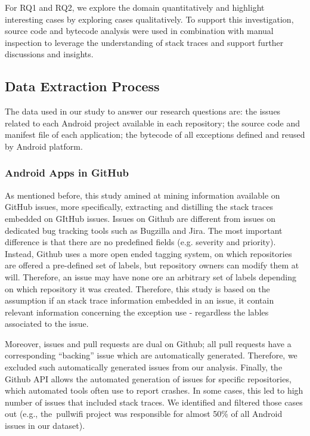 \documentclass[conference]{IEEEtran}
\begin{document}
For RQ1 and RQ2, we explore the domain quantitatively and highlight interesting cases by 
exploring cases qualitatively. To support this investigation, source code and bytecode 
analysis were used in combination with manual inspection to leverage the  understanding of stack traces and support further discussions and insights. 

\subsection{Data Extraction Process}
\label{sec:miningproc}

The data used in our study to answer our research questions are: the issues related to each 
Android project available in each repository; the source code and manifest file of each application;
the bytecode of all exceptions defined and reused by Android platform.

\subsubsection{Android Apps in GitHub}
\label{sec:git}

As mentioned before, this study amined at mining information available on GitHub issues,
more specifically, extracting and distilling the stack traces embedded on GItHub issues. 
Issues on Github are different from issues on dedicated bug tracking tools such as 
Bugzilla and Jira. The most important difference is that there are no predefined fields
  (e.g. severity and priority). Instead, Github uses a more open ended tagging system, on which
repositories are offered a pre-defined set of labels, but repository owners can modify 
them at will. Therefore, an issue may have none ore an arbitrary set of labels depending 
on which repository it was created. Therefore, this study is based on the assumption 
if an stack trace information embedded in an issue, it contain relevant information
 concerning the exception use -  regardless the lables associated to the issue.

Moreover, issues and pull requests are dual on Github; all pull requests have a corresponding 
``backing'' issue which
are automatically generated. Therefore, we excluded such automatically generated
issues from our analysis. Finally, the Github API allows the automated
generation of issues for specific repositories, which automated tools often use
to report crashes. In some cases, this led to high number of issues that
included stack traces. We identified and filtered those cases out (e.g.,
the~\textsf{pullwifi} project was responsible for almost 50\% of all Android issues in our dataset).
\end{document}
